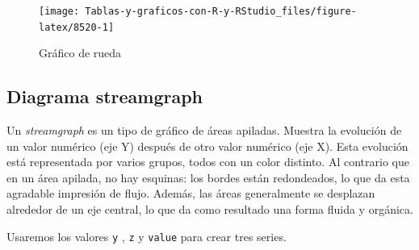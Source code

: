 \documentclass[
]{book}
\begin{document}
\begin{figure}[H]

{\centering \texttt{[image: Tablas-y-graficos-con-R-y-RStudio\_files/figure-latex/8520-1]} 

}

\caption{Gráfico de rueda}\label{fig:8520}
\end{figure}

\hypertarget{diagrama-streamgraph}{%
\subsection{Diagrama streamgraph}\label{diagrama-streamgraph}}

Un \emph{streamgraph} es un tipo de gráfico de áreas apiladas. Muestra la evolución de un valor numérico (eje Y) después de otro valor numérico (eje X). Esta evolución está representada por varios grupos, todos con un color distinto. Al contrario que en un área apilada, no hay esquinas: los bordes están redondeados, lo que da esta agradable impresión de flujo. Además, las áreas generalmente se desplazan alrededor de un eje central, lo que da como resultado una forma fluida y orgánica.

Usaremos los valores \texttt{y} , \texttt{z} y \texttt{value} para crear tres series.
\end{document}
